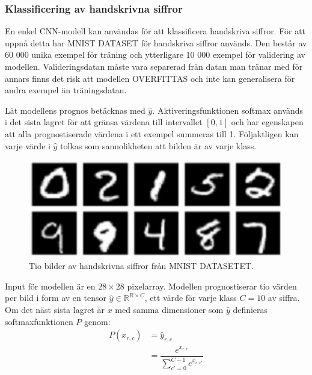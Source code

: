 \documentclass[a4paper,11pt,twoside]{article}
\begin{document}
\subsubsection{Klassificering av handskrivna siffror}
En enkel CNN-modell kan användas för att klassificera handskriva siffror. För att uppnå detta har MNIST DATASET för handskriva siffror används. Den består av 60 000 unika exempel för träning och ytterligare 10 000 exempel för validering av modellen. Valideringsdatan måste vara separerad från datan man tränar med för annars finns det risk att modellen OVERFITTAS och inte kan generalisera för andra exempel än träningsdatan. \cite{MNIST}

Låt modellens prognos betäcknas med $\hat{y}$. Aktiveringsfunktionen softmax används i det sista lagret för att gränsa värdena till intervallet $[0,1]$ och har egenskapen att alla prognostiserade värdena i ett exempel summeras till 1. Följaktligen kan varje värde i $\hat{y}$ tolkas som sannolikheten att bilden är av varje klass. \cite{cs231n}

\begin{figure}[h]\label{figMNIST}
	\centering
  		\includegraphics[scale=1]{mnist.png}
  	\caption{Tio bilder av handskrivna siffror från MNIST DATASETET. \cite{MNIST}}
\end{figure}

Input för modellen är en $28 \times 28$ pixelarray. Modellen prognostiserar tio värden per bild i form av en tensor $\hat{y} \in \mathbb{R}^{R \times C}$, ett värde för varje klass $C=10$ av siffra. Om det näst sista lagret är $x$ med samma dimensioner som $\hat{y}$ definieras softmaxfunktionen $P$ genom: \cite{cs231n} \cite{notesonbackprop} \cite{websoftmax} 
\begin{equation}
\begin{split}
P(x_{r,c}) 
	& = \hat{y}_{r,c} \\
	& = \dfrac{e^{x_{r,c}}}{\sum^{C-1}_{c'=0}e^{x_{r,c'}}}\\
\end{split}
\end{equation}
\end{document}

